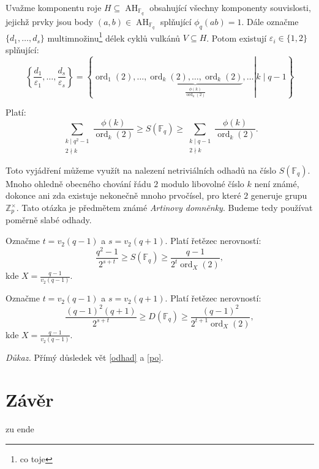 \documentclass[12pt]{report}
\DeclareMathOperator{\ord}{ord}
\DeclareMathOperator{\AH}{AH}
\begin{document}
\begin{dusledek}
Uvažme komponentu roje $H \subseteq \AH_{\mathbb{F}_q}$ obsahující všechny komponenty souvislosti, jejichž prvky jsou body $(a,b) \in \AH_{\mathbb{F}_q}$ splňující $\phi_q(ab)=1$. Dále označme $\lbrace d_1,\dots,d_s \rbrace$ multimnožinu\footnote{co toje} délek cyklů vulkánů $V \subseteq H$. Potom existují $\varepsilon_i \in \lbrace 1,2 \rbrace$ splňující:
$$\left\lbrace \frac{d_1}{\varepsilon_1},\dots,\frac{d_s}{\varepsilon_s} \right\rbrace = \left\lbrace \left. \ord_1(2),\dots, \underbrace{\ord_k(2),\dots,\ord_k(2)}_{\frac{\phi(k)}{\ord_k(2)}},\dots \right\vert k \mid q-1 \right\rbrace$$
\end{dusledek}






\begin{veta}
Platí:
$$\sum_{\substack{k \mid q^2-1 \\ 2 \nmid k}} \frac{\phi(k)}{\ord_k (2)} \geqslant S(\mathbb{F}_q) \geqslant \sum_{\substack{k \mid q-1 \\ 2 \nmid k}} \frac{\phi(k)}{\ord_k (2)}.$$
\end{veta}


Toto vyjádření můžeme využít na nalezení netriviálních odhadů na číslo $S(\mathbb{F}_q)$. Mnoho ohledně obecného chování řádu $2$ modulo libovolné číslo $k$ není známé, dokonce ani zda existuje nekonečně mnoho prvočísel, pro které $2$ generuje grupu $\mathbb{Z}_{p} ^{\times}$. Tato otázka je předmětem známé \textit{Artinovy domněnky}. Budeme tedy používat poměrně slabé odhady.

\begin{veta}\label{odhad} 
Označme $t = v_2(q-1)$ a $s = v_2(q+1)$. Platí řetězec nerovností:
$$\frac{q^2-1}{2^{s+t}} \geqslant S(\mathbb{F}_q) \geqslant \frac{q-1}{2^t \ord_X ( 2 )},$$
kde $X = \frac{q-1}{v_2(q-1)}$.
\end{veta}

\begin{dusledek}
Označme $t = v_2(q-1)$ a $s = v_2(q+1)$. Platí řetězec nerovností:
$$ \frac{(q-1)^2 (q+1)}{2^{s+t}} \geqslant D(\mathbb{F}_q) \geqslant  \frac{(q-1)^2}{2^{t+1} \ord_X ( 2 )},$$
kde $X = \frac{q-1}{v_2(q-1)}$.
\end{dusledek}
\noindent \textit{Důkaz.} Přímý důsledek vět \ref{odhad} a \ref{po}.





\chapter*{Závěr}
zu ende
\end{document}
